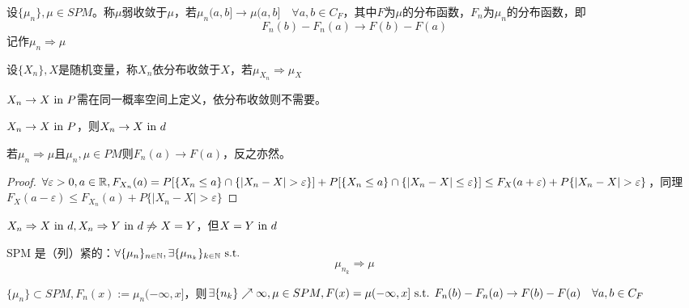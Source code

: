 \documentclass{ctexbook}
\begin{document}
\begin{Def}
  设$\{\mu_{n}\},\mu\in SPM$。称$\mu$弱收敛于$\mu$，若$\mu_{n}(a,b]\to\mu(a,b]\quad \forall a,b\in C_{F}$，其中$F$为$\mu$的分布函数，$F_{n}$为$\mu_{n}$的分布函数，即
  \[F_{n}(b)-F_{n}(a)\to F(b)-F(a)\]
  记作$\mu_{n}\Rightarrow \mu$
\end{Def}

\begin{Def}
  设$\{X_{n}\},X$是随机变量，称$X_{n}$依分布收敛于$X$，若$\mu_{X_{n}}\Rightarrow \mu_{X}$
\end{Def}

\begin{Rmk}
  $X_{n}\to X\text{ in } P$需在同一概率空间上定义，依分布收敛则不需要。
\end{Rmk}

\begin{Prop}
  $X_{n}\to X\text{ in } P$，则$X_{n}\to X\text{ in } d$
\end{Prop}
\begin{Rmk}
  若$\mu_{n}\Rightarrow\mu$且$\mu_{n},\mu\in PM$则$F_{n}(a)\to F(a)$，反之亦然。
\end{Rmk}

\begin{proof}
  $\forall\varepsilon>0,a\in\R,F_{X_{n}}(a)=P[\{X_{n}\leq a\}\cap \{|X_{n}-X|>\varepsilon\}]+P[\{X_{n}\leq a\}\cap \{|X_{n}-X|\leq\varepsilon\}]\leq F_{X}(a+\varepsilon)+P\{|X_{n}-X|>\varepsilon\}$，同理$F_{X}(a-\varepsilon)\leq F_{X_{n}}(a)+P\{|X_{n}-X|>\varepsilon\}$
\end{proof}

\begin{Prop}
  $X_{n}\Rightarrow X\text{ in } d,X_{n}\Rightarrow Y \text{ in } d\not \Rightarrow X=Y$，但$X=Y\text{ in } d$
\end{Prop}

\begin{Prop}
  SPM 是（列）紧的：$\forall \{\mu_{n}\}_{n\in\mathbb{N}},\exists \{\mu_{n_{k}}\}_{k\in\mathbb{N}}\text{ s.t. }$
  \[\mu_{n_{k}}\Rightarrow \mu\]
\end{Prop}

\begin{Prop}
  $\{\mu_{n}\}\subset SPM, F_{n}(x):=\mu_{n}(-\infty,x]$，则$\exists \{n_{k}\}\nearrow\infty,\mu\in SPM, F(x)=\mu(-\infty,x]\text{ s.t. } F_{n}(b)-F_{n}(a)\to F(b)-F(a)\quad \forall a,b\in C_{F}$
\end{Prop}
\end{document}
